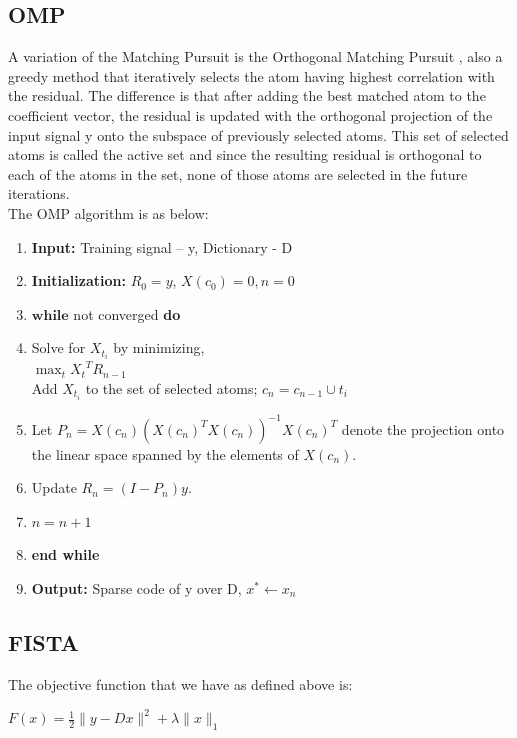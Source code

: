\documentclass{article} %
\begin{document}
\subsection{OMP}
A variation of the Matching Pursuit is the Orthogonal Matching Pursuit \citep{pati1993orthogonal}, also a greedy method that iteratively selects the atom having highest correlation with the residual. The difference is that after adding the best matched atom to the coefficient vector, the residual is updated with the orthogonal projection of the input signal y onto the subspace of previously selected atoms. This set of selected atoms is called the active set and since the resulting residual is orthogonal to each of the atoms in the set, none of those atoms are selected in the future iterations. \\

The OMP algorithm is as below:

\begin{enumerate}
\item \textbf{Input:} Training signal – y, Dictionary - D
\item \textbf{Initialization:} $R_0=y$, $X(c_0)=0, n=0$
\item $\textbf{while}$ not converged \textbf{do}
\item \hspace*{.4cm} Solve for $X_{t_i}$ by minimizing,\\
\hspace*{.4cm} $\max_t{{X_t}^TR_{n-1}}$\\
\hspace*{.4cm} Add $X_{t_i}$ to the set of selected atoms; $c_n = c_{n-1}\cup {t_i}$
\item \hspace*{.4cm} Let $P_n = X(c_n){(X(c_n)^TX(c_n))}^{-1}{X(c_n)}^T$ denote the projection onto the linear space spanned by the elements of $X(c_n)$. 
\item \hspace*{.4cm} Update $R_n = (I - P_n)y$.
\item \hspace*{.4cm} $n=n+1$
\item \textbf{end while}
\item \textbf{Output: }Sparse code of y over D, $x^* \leftarrow x_n$
\end{enumerate}


\vspace{.2cm}
\subsection{FISTA}
\vspace{.2cm}
The objective function that we have as defined above is:
\begin{center}
$F(x) = \frac{1}{2}\|y - Dx\|^2 + \lambda\|x\|_1$
\end{center}
\end{document}
